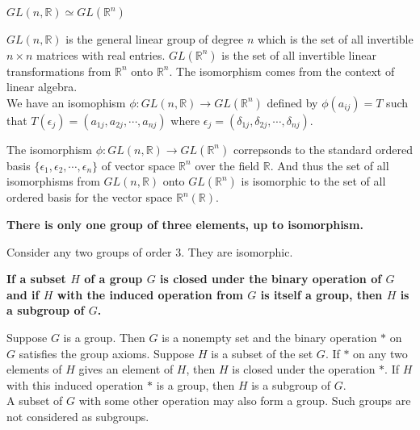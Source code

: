\documentclass[a4paper,12pt,openany]{book}
\newcommand{\iso}{\simeq} %
\begin{document}
\textbf{\phantom{}}
\textbf{$GL(n,\mathbb{R}) \iso GL(\mathbb{R}^n)$}\\
\begin{story}
	$GL(n,\mathbb{R})$ is the general linear group of degree $n$ which is the set of all invertible $n \times n$ matrices with real entries.
	$GL(\mathbb{R}^n)$ is the set of all invertible linear transformations from $\mathbb{R}^n$ onto $\mathbb{R}^n$. 
	The isomorphism comes from the context of linear algebra.\\

	We have an isomophism $\phi : GL(n,\mathbb{R}) \to GL(\mathbb{R}^n)$ defined by $\phi(a_{ij}) = T$ such that $T(\epsilon_j)=(a_{1j},a_{2j},\cdots,a_{nj})$ where $\epsilon_j = (\delta_{1j},\delta_{2j},\cdots,\delta_{nj})$.
\end{story}

\begin{challenge}
	The isomorphism $\phi : GL(n,\mathbb{R}) \to GL(\mathbb{R}^n)$ correpsonds to the standard ordered basis $\{\epsilon_1,\epsilon_2,\cdots,\epsilon_n\}$ of vector space $\mathbb{R}^n$ over the field $\mathbb{R}$.
	And thus the set of all isomorphisms from $GL(n,\mathbb{R})$ onto $GL(\mathbb{R}^n)$ is isomorphic to the set of all ordered basis for the vector space $\mathbb{R}^n(\mathbb{R})$.
\end{challenge}

\textbf{There is only one group of three elements, up to isomorphism.}
\textbf{\phantom{}}\\
\begin{story}
	Consider any two groups of order 3. They are isomorphic.
\end{story}

\textbf{\phantom{}}
\textbf{If a subset $H$ of a group $G$ is closed under the binary operation of $G$ and if $H$ with the induced operation from $G$ is itself a group, then $H$ is a subgroup of $G$.}\\
\begin{story}
	Suppose $G$ is a group.
	Then $G$ is a nonempty set and the binary operation $\ast$ on $G$ satisfies the group axioms.
	Suppose $H$ is a subset of the set $G$.
	If $\ast$ on any two elements of $H$ gives an element of $H$, then $H$ is closed under the operation $\ast$.
	If $H$ with this induced operation $\ast$ is a group, then $H$ is a subgroup of $G$.\\

	A subset of $G$ with some other operation may also form a group.
	Such groups are not considered as subgroups.
\end{story}
\end{document}
